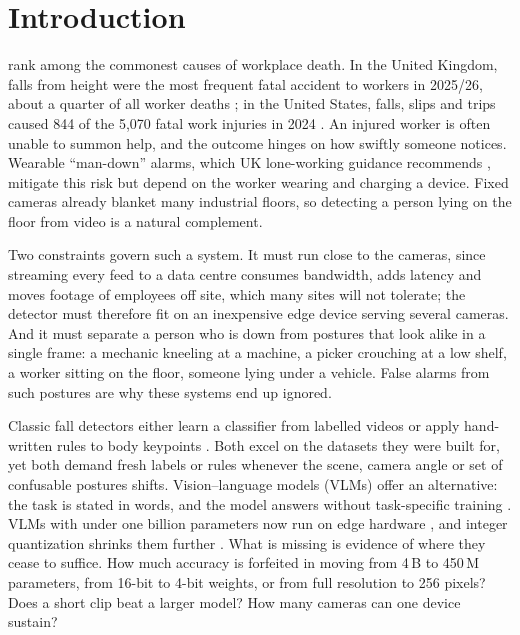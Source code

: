 \section{Introduction}
\label{sec:intro}

 rank among the commonest causes of workplace death. In the United Kingdom, falls from height were the most frequent fatal accident to workers in 2025/26, about a quarter of all worker deaths \cite{hse2026fatal}; in the United States, falls, slips and trips caused 844 of the 5,070 fatal work injuries in 2024 \cite{bls2026cfoi}. An injured worker is often unable to summon help, and the outcome hinges on how swiftly someone notices. Wearable ``man-down'' alarms, which UK lone-working guidance recommends \cite{hse2020loneworkers}, mitigate this risk but depend on the worker wearing and charging a device. Fixed cameras already blanket many industrial floors, so detecting a person lying on the floor from video is a natural complement.

Two constraints govern such a system. It must run close to the cameras, since streaming every feed to a data centre consumes bandwidth, adds latency and moves footage of employees off site, which many sites will not tolerate; the detector must therefore fit on an inexpensive edge device serving several cameras. And it must separate a person who is down from postures that look alike in a single frame: a mechanic kneeling at a machine, a picker crouching at a low shelf, a worker sitting on the floor, someone lying under a vehicle. False alarms from such postures are why these systems end up ignored.

Classic fall detectors either learn a classifier from labelled videos \cite{mubashir2013survey,igual2013challenges} or apply hand-written rules to body keypoints \cite{cao2021openpose,maji2022yolopose}. Both excel on the datasets they were built for, yet both demand fresh labels or rules whenever the scene, camera angle or set of confusable postures shifts. Vision--language models (VLMs) offer an alternative: the task is stated in words, and the model answers without task-specific training \cite{radford2021clip,liu2023llava}. VLMs with under one billion parameters now run on edge hardware \cite{marafioti2025smolvlm,amini2025lfm2}, and integer quantization shrinks them further \cite{dettmers2022llmint8,frantar2023gptq,lin2024awq}. What is missing is evidence of where they cease to suffice. How much accuracy is forfeited in moving from 4\,B to 450\,M parameters, from 16-bit to 4-bit weights, or from full resolution to 256 pixels? Does a short clip beat a larger model? How many cameras can one device sustain?

